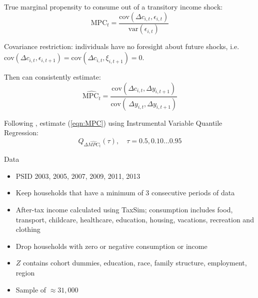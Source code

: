 \documentclass{beamer}
\begin{document}
\begin{frame}{}
	
	True marginal propensity to consume out of a transitory income shock:
	\begin{equation*}
	\text{MPC}_t = \frac{\text{cov}(\Delta c_{i,t}, \epsilon_{i,t})}{\text{var}(\epsilon_{i,t})}	
	\end{equation*}

Covariance restriction:  {\small individuals have no foresight about future shocks, i.e. $\text{cov}(\Delta c_{i,t},\epsilon_{i,t+1}) = \text{cov}(\Delta c_{i,t},\xi_{i,t+1}) = 0$.} \\
\vspace{2mm}

Then can consistently estimate:
\begin{equation}
\label{eqn:MPC}
\widehat{\text{MPC}_t}= \frac{\text{cov}(\Delta c_{i,t}, \Delta y_{i,t+1})}{\text{cov}(\ \Delta y_{i,t}, \Delta y_{i,t+1})}
\end{equation}

Following \citet{ChernozhukovHansen2005}, estimate (\ref{eqn:MPC}) using Instrumental Variable Quantile Regression:
\begin{equation*}
Q_{\Delta \widehat{MPC}_{t}}(\tau), \quad \tau ={ 0.5, 0.10...0.95} 
\end{equation*}

\end{frame}



 \begin{frame}{Data}
 	\begin{itemize}
 	
\item PSID 2003, 2005, 2007, 2009, 2011, 2013
\item Keep households that have a minimum of 3 consecutive periods of data
\item After-tax income calculated using TaxSim; consumption includes food, transport, childcare, healthcare, education, housing, vacations, recreation and clothing
\item Drop households with zero or negative consumption or income
\item  $Z$ contains cohort dummies, education, race, family structure, employment, region
\item Sample of $\approx 31,000$
\end{itemize}
\end{frame}
\end{document}
